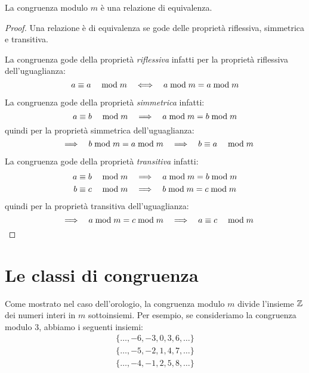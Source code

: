 \begin{mdframed}
    \begin{teorema}
        La congruenza modulo $m$ è una relazione di equivalenza.
    \end{teorema}
    \begin{proof}
        Una relazione è di equivalenza se gode delle proprietà riflessiva, simmetrica e transitiva.

        La congruenza gode della proprietà \emph{riflessiva} infatti per la proprietà riflessiva dell'uguaglianza:
        \begin{equation*}
             a \equiv a \quad\bmod m   \quad\Longleftrightarrow\quad  a  \bmod  m = a  \bmod  m
        \end{equation*}
        
        La congruenza gode della proprietà \emph{simmetrica} infatti:
        \begin{equation*}            
             a \equiv b \quad\bmod m   \quad\Longrightarrow\quad  a  \bmod  m = b  \bmod  m 
        \end{equation*}
        quindi per la proprietà simmetrica dell'uguaglianza:
        \begin{equation*}
             \quad\Longrightarrow\quad  b  \bmod  m = a  \bmod  m  \quad\Longrightarrow\quad   b \equiv a \quad\bmod m 
        \end{equation*}
        
        La congruenza gode della proprietà \emph{transitiva} infatti:
        \begin{gather*}
             a \equiv b \quad\bmod m   \quad\Longrightarrow\quad  a  \bmod  m = b  \bmod  m \\
             b \equiv c \quad\bmod m   \quad\Longrightarrow\quad  b  \bmod  m = c  \bmod  m
        \end{gather*}
        quindi per la proprietà transitiva dell'uguaglianza:
        \begin{equation*}
             \quad\Longrightarrow\quad  a  \bmod  m = c  \bmod  m  \quad\Longrightarrow\quad   a \equiv c \quad\bmod m 
        \end{equation*}
    \end{proof}
\end{mdframed}

\section{Le classi di congruenza}

Come mostrato nel caso dell'orologio, la congruenza modulo $m$ divide l'insieme $ \mathbb{Z} $ dei numeri interi in $m$ sottoinsiemi. Per esempio, se consideriamo la congruenza modulo 3, abbiamo i seguenti insiemi:
\begin{gather*}
    \{\dots, -6, -3, 0, 3, 6, \dots\} \\
    \{\dots, -5, -2, 1, 4, 7, \dots\} \\
    \{\dots, -4, -1, 2, 5, 8, \dots\}
\end{gather*}

